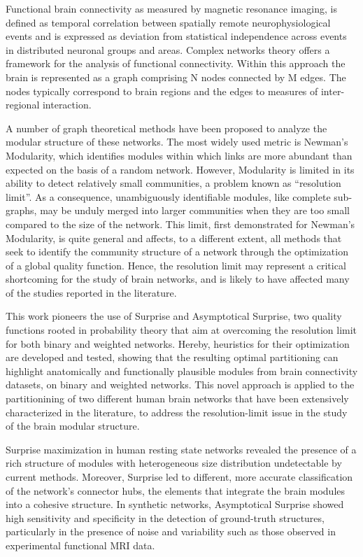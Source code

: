 Functional brain connectivity as measured by magnetic resonance imaging, is defined as temporal correlation between spatially remote neurophysiological events and is expressed as deviation from statistical independence across events in distributed neuronal groups and areas.
Complex networks theory offers a framework for the analysis of functional connectivity.
Within this approach the brain is represented as a graph comprising N nodes connected by M edges.
The nodes typically correspond to brain regions and the edges to measures of inter-regional interaction.

A number of graph theoretical methods have been proposed to analyze the modular structure of these networks.
The most widely used metric is Newman's Modularity, which identifies modules within which links are more abundant than expected on the basis of a random network.
However, Modularity is limited in its ability to detect relatively small communities, a problem known as ``resolution limit''.
As a consequence, unambiguously identifiable modules, like complete sub-graphs, may be unduly merged into larger communities when they are too small compared to the size of the network.
This limit, first demonstrated for Newman's Modularity, is quite general and affects, to a different extent, all methods that seek to identify the community structure of a network through the optimization of a global quality function.
Hence, the resolution limit may represent a critical shortcoming for the study of brain networks, and is likely to have affected many of the studies reported in the literature.

This work pioneers the use of Surprise and Asymptotical Surprise, two quality functions rooted in probability theory that aim at overcoming the resolution limit for both binary and weighted networks.
Hereby, heuristics for their optimization are developed and tested, showing that the resulting optimal partitioning can highlight anatomically and functionally plausible modules from brain connectivity datasets, on binary and weighted networks.
This novel approach is applied to the partitionining of two different human brain networks that have been extensively characterized in the literature, to address the resolution-limit issue in the study of the brain modular structure.

Surprise maximization in human resting state networks revealed the presence of a rich structure of modules with heterogeneous size distribution undetectable by current methods.
Moreover, Surprise led to different, more accurate classification of the network's connector hubs, the elements that integrate the brain modules into a cohesive structure.
In synthetic networks, Asymptotical Surprise showed high sensitivity and specificity in the detection of ground-truth structures, particularly in the presence of noise and variability such as those observed in experimental functional MRI data.

